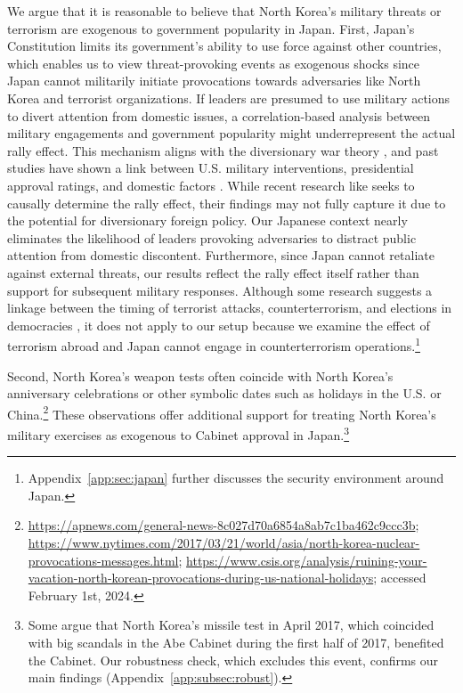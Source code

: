 \documentclass[letterpaper,12pt]{scrartcl}
\begin{document}
We argue that it is reasonable to believe that North Korea's military threats or terrorism are exogenous to government popularity in Japan. First, Japan's Constitution limits its government's ability to use force against other countries, which enables us to view threat-provoking events as exogenous shocks since Japan cannot militarily initiate provocations towards adversaries like North Korea and terrorist organizations. If leaders are presumed to use military actions to divert attention from domestic issues, a correlation-based analysis between military engagements and government popularity might underrepresent the actual rally effect. This mechanism aligns with the diversionary war theory \citep{gelpi1997,derouen2000presidents}, and past studies have shown a link between U.S. military interventions, presidential approval ratings, and domestic factors \citep{James1991JCR,Fordham1998ISQ}. While recent research like \citet{seo2023} seeks to causally determine the rally effect, their findings may not fully capture it due to the potential for diversionary foreign policy. Our Japanese context nearly eliminates the likelihood of leaders provoking adversaries to distract public attention from domestic discontent. Furthermore, since Japan cannot retaliate against external threats, our results reflect the rally effect itself rather than support for subsequent military responses. Although some research suggests a linkage between the timing of terrorist attacks, counterterrorism, and elections in democracies \citep{aksoy2014,bali2014,nanes2017}, it does not apply to our setup because we examine the effect of terrorism abroad and Japan cannot engage in counterterrorism operations.\footnote{Appendix~\ref{app:sec:japan} further discusses the security environment around Japan.}

Second, North Korea's weapon tests often coincide with North Korea's anniversary celebrations or other symbolic dates such as holidays in the U.S. or China.\footnote{\href{https://apnews.com/general-news-8c027d70a6854a8ab7c1ba462c9ccc3b}{https://apnews.com/general-news-8c027d70a6854a8ab7c1ba462c9ccc3b}; \href{https://www.nytimes.com/2017/03/21/world/asia/north-korea-nuclear-provocations-messages.html}{https://www.nytimes.com/2017/03/21/world/asia/north-korea-nuclear-provocations-messages.html}; \href{https://www.csis.org/analysis/ruining-your-vacation-north-korean-provocations-during-us-national-holidays}{https://www.csis.org/analysis/ruining-your-vacation-north-korean-provocations-during-us-national-holidays}; accessed February 1st, 2024.} These observations offer additional support for treating North Korea's military exercises as exogenous to Cabinet approval in Japan.\footnote{\label{before_2017}Some argue that North Korea's missile test in April 2017, which coincided with big scandals in the Abe Cabinet during the first half of 2017, benefited the Cabinet. Our robustness check, which excludes this event, confirms our main findings (Appendix~\ref{app:subsec:robust}).}
\end{document}
